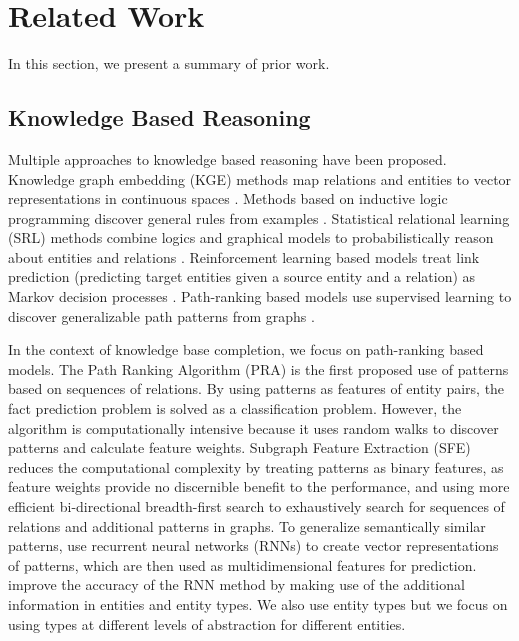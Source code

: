 \documentclass[letterpaper]{article} %
\begin{document}
\section{Related Work}

In this section, we present a summary of prior work.

\subsection{Knowledge Based Reasoning}
Multiple approaches to knowledge based reasoning have been proposed. Knowledge graph embedding (KGE) methods map relations and entities to vector representations in continuous spaces \cite{nickel}. Methods based on inductive logic programming discover general rules from examples \cite{quinlan1993foil}. Statistical relational learning (SRL) methods combine logics and graphical models to probabilistically reason about entities and relations \cite{getoor2007srl}. Reinforcement learning based models treat link prediction (predicting target entities given a source entity and a relation) as Markov decision processes \cite{deeppath,das2017go}. Path-ranking based models use supervised learning to discover generalizable path patterns from graphs \cite{pra,sfe,cvsm,chains}.

In the context of knowledge base completion, we focus on path-ranking based models. The Path Ranking Algorithm (PRA) \cite{pra} is the first proposed use of patterns based on sequences of relations.  By using patterns as features of entity pairs, the fact prediction problem is solved as a classification problem.  However, the algorithm is computationally intensive because it uses random walks to discover patterns and calculate feature weights.  Subgraph Feature Extraction (SFE) \cite{sfe} reduces the computational complexity by treating patterns as binary features, as feature weights provide no discernible benefit to the performance, and using more efficient bi-directional breadth-first search to exhaustively search for sequences of relations and additional patterns in graphs.  To generalize semantically similar patterns, \cite{cvsm} use recurrent neural networks (RNNs) to create vector representations of patterns, which are then used as multidimensional features for prediction. \cite{chains} improve the accuracy of the RNN method by making use of the additional information in entities and entity types. We also use entity types but we focus on using types at different levels of abstraction for different entities.
\end{document}
